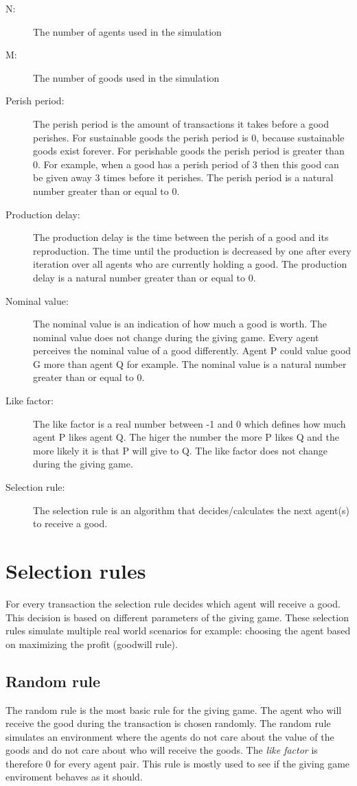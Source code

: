 \documentclass[twoside,openright]{uva-bachelor-thesis}
\begin{document}
\begin{description}
  \item[N:] The number of agents used in the simulation
  \item[M:] The number of goods used in the simulation
  \item[Perish period:] The perish period is the amount of transactions it takes before a good perishes. For sustainable goods the perish period is 0, because sustainable goods exist forever. For perishable goods the perish period is greater than 0. For example, when a good has a perish period of 3 then this good can be given away 3 times before it perishes. The perish period is a natural number greater than or equal to 0.
  \item[Production delay:] The production delay is the time between the perish of a good and its reproduction. The time until the production is decreased by one after every iteration over all agents who are currently holding a good. The production delay is a natural number greater than or equal to 0.
  \item[Nominal value:] The nominal value is an indication of how much a good is worth. The nominal value does not change during the giving game. Every agent perceives the nominal value of a good differently. Agent P could value good G more than agent Q for example. The nominal value is a natural number greater than or equal to 0.
  \item[Like factor:] The like factor is a real number between -1 and 0 which defines how much agent P likes agent Q. The higer the number the more P likes Q and the more likely it is that P will give to Q. The like factor does not change during the giving game. 
  \item[Selection rule:] The selection rule is an algorithm that decides/calculates the next agent(s) to receive a good.

\end{description}

\section{Selection rules}
For every transaction the selection rule decides which agent will receive a good. This decision is based on different parameters of the giving game. These selection rules simulate  multiple real world scenarios for example: choosing the agent based on maximizing the profit (goodwill rule).

\subsection{Random rule}
The random rule is the most basic rule for the giving game. The agent who will receive the good during the transaction is chosen randomly. The random rule simulates an environment where the agents do not care about the value of the goods and do not care about who will receive the goods. The \textit{like factor} is therefore 0 for every agent pair. This rule is mostly used to see if the giving game enviroment behaves as it should.
\end{document}
